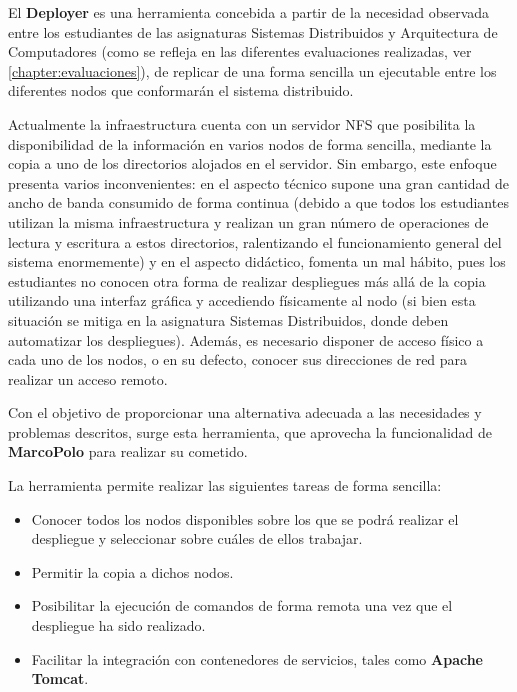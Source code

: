El \textbf{Deployer} es una herramienta concebida a partir de la necesidad observada entre los estudiantes de las asignaturas Sistemas Distribuidos y Arquitectura de Computadores (como se refleja en las diferentes evaluaciones realizadas, ver \ref{chapter:evaluaciones}), de replicar de una forma sencilla un ejecutable entre los diferentes nodos que conformarán el sistema distribuido.

Actualmente la infraestructura cuenta con un servidor NFS que posibilita la disponibilidad de la información en varios nodos de forma sencilla, mediante la copia a uno de los directorios alojados en el servidor. Sin embargo, este enfoque presenta varios inconvenientes: en el aspecto técnico supone una gran cantidad de ancho de banda consumido de forma continua (debido a que todos los estudiantes utilizan la misma infraestructura y realizan un gran número de operaciones de lectura y escritura a estos directorios, ralentizando el funcionamiento general del sistema enormemente) y en el aspecto didáctico, fomenta un mal hábito, pues los estudiantes no conocen otra forma de realizar despliegues más allá de la copia utilizando una interfaz gráfica y accediendo físicamente al nodo (si bien esta situación se mitiga en la asignatura Sistemas Distribuidos, donde deben automatizar los despliegues). Además, es necesario disponer de acceso físico a cada uno de los nodos, o en su defecto, conocer sus direcciones de red para realizar un acceso remoto.

Con el objetivo de proporcionar una alternativa adecuada a las necesidades y problemas descritos, surge esta herramienta, que aprovecha la funcionalidad de \textbf{MarcoPolo} para realizar su cometido.

La herramienta permite realizar las siguientes tareas de forma sencilla:

\begin{itemize}
\item Conocer todos los nodos disponibles sobre los que se podrá realizar el despliegue y seleccionar sobre cuáles de ellos trabajar.
\item Permitir la copia a dichos nodos.
\item Posibilitar la ejecución de comandos de forma remota una vez que el despliegue ha sido realizado.
\item Facilitar la integración con contenedores de servicios, tales como \textbf{Apache Tomcat}.
\end{itemize}

